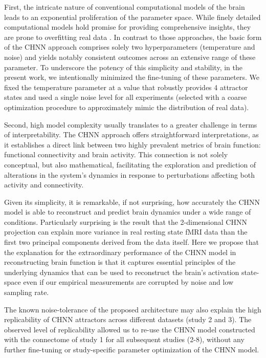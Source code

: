 \documentclass{article}
\begin{document}
First, the intricate nature of conventional computational models of the brain leads to an exponential proliferation of the parameter space.
While finely detailed computational models hold promise for providing comprehensive insights, they are prone to overfitting real data \citep{breakspear2017dynamic}.
In contrast to those approaches, the basic form of the CHNN approach comprises solely two hyperparameters (temperature and noise) and yields notably consistent outcomes across an extensive range of these parameter. To underscore the potency of this simplicity and stability, in the present work, we intentionally minimized the fine-tuning of these parameters. We fixed the temperature parameter at a value that robustly provides 4 attractor
states and used a single noise level for all experiments (selected with a coarse optimization procedure to approximately
mimic the distribution of real data).

Second, high model complexity usually translates to a greater challenge in terms of interpretability.
The CHNN approach offers straightforward interpretations, as it establishes a
direct link between two highly prevalent metrics of brain function: functional connectivity and brain activity.
This connection is not solely conceptual, but also mathematical, facilitating the exploration and prediction of alterations in the system's dynamics in response to perturbations affecting both activity and connectivity.

Given its simplicity, it is remarkable, if not surprising, how accurately the CHNN model is able to
reconstruct and predict brain dynamics under a wide range of conditions. Particularly surprising is the result
that the 2-dimensional CHNN projection can explain more variance in real resting state fMRI data than the first two principal components derived from the data itself.
Here we propose that the explanation for the extraordinary performance of the CHNN model in reconstructing brain function is that it captures essential principles of the underlying dynamics that can be used to reconstruct the brain's activation state-space even if our empirical measurements are corrupted by noise and low sampling rate.

The known noise-tolerance of the proposed architecture may also explain the high replicability of CHNN attractors across different
datasets (study 2 and 3). The observed level of replicability allowed us to re-use the CHNN model constructed with the
connectome of study 1 for all subsequent studies (2-8), without any further fine-tuning or study-specific parameter
optimization of the CHNN model.
\end{document}
